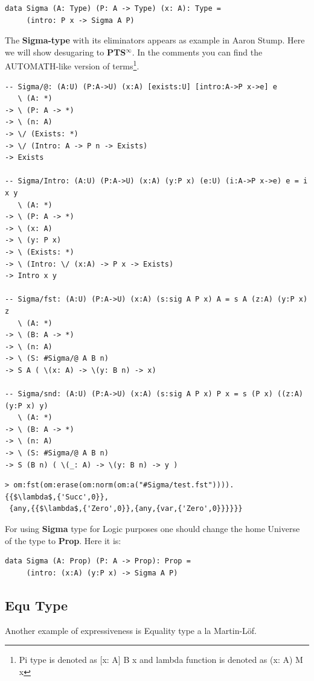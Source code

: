 \documentclass{aip-cp}
\begin{document}
\begin{lstlisting}
data Sigma (A: Type) (P: A -> Type) (x: A): Type =
     (intro: P x -> Sigma A P)
\end{lstlisting}

The {\bf Sigma-type} with its eliminators appears as example in Aaron Stump\cite{Stump17}.
Here we will show desugaring to {\bf PTS$^\infty$}.
In the comments you can find the AUTOMATH-like version of terms\footnote{Pi type is denoted as [x: A] B x and lambda function is denoted as (x: A) M x}.

\begin{lstlisting}
-- Sigma/@: (A:U) (P:A->U) (x:A) [exists:U] [intro:A->P x->e] e
   \ (A: *)
-> \ (P: A -> *)
-> \ (n: A)
-> \/ (Exists: *)
-> \/ (Intro: A -> P n -> Exists)
-> Exists

-- Sigma/Intro: (A:U) (P:A->U) (x:A) (y:P x) (e:U) (i:A->P x->e) e = i x y
   \ (A: *)
-> \ (P: A -> *)
-> \ (x: A)
-> \ (y: P x)
-> \ (Exists: *)
-> \ (Intro: \/ (x:A) -> P x -> Exists)
-> Intro x y

-- Sigma/fst: (A:U) (P:A->U) (x:A) (s:sig A P x) A = s A (z:A) (y:P x) z
   \ (A: *)
-> \ (B: A -> *)
-> \ (n: A)
-> \ (S: #Sigma/@ A B n)
-> S A ( \(x: A) -> \(y: B n) -> x)

-- Sigma/snd: (A:U) (P:A->U) (x:A) (s:sig A P x) P x = s (P x) ((z:A) (y:P x) y)
   \ (A: *)
-> \ (B: A -> *)
-> \ (n: A)
-> \ (S: #Sigma/@ A B n)
-> S (B n) ( \(_: A) -> \(y: B n) -> y )
\end{lstlisting}

\begin{lstlisting}[mathescape=true]
> om:fst(om:erase(om:norm(om:a("#Sigma/test.fst")))).
{{$\lambda$,{'Succ',0}},
 {any,{{$\lambda$,{'Zero',0}},{any,{var,{'Zero',0}}}}}}
\end{lstlisting}

For using {\bf Sigma} type for Logic purposes one should change the
home Universe of the type to {\bf Prop}. Here it is:

\begin{lstlisting}[mathescape=true]
data Sigma (A: Prop) (P: A -> Prop): Prop =
     (intro: (x:A) (y:P x) -> Sigma A P)
\end{lstlisting}

\subsection{Equ Type}
Another example of expressiveness is Equality type a la Martin-Löf.
\end{document}
